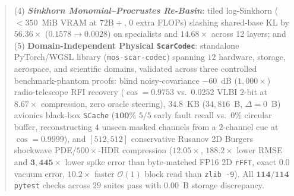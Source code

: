 \documentclass[10pt,twocolumn]{article}
\begin{document}
\begin{abstract}
(4) \textbf{\emph{Sinkhorn Monomial--Procrustes Re-Basin}}: tiled log-Sinkhorn ($<350$~MiB VRAM at $72\text{B}+$, $0$ extra FLOPs) slashing shared-base KL by $56.36\times$ ($0.1578 \to 0.0028$) on specialists and $14.68\times$ across $12$ layers; and
(5) \textbf{Domain-Independent Physical \texttt{ScarCodec}}: standalone PyTorch/WGSL library (\texttt{mos-scar-codec}) spanning $12$ hardware, storage, aerospace, and scientific domains, validated across three controlled benchmark-phantom proofs: blind noisy-covariance $-60$~dB ($1{,}000\times$) radio-telescope RFI recovery ($\cos=\mathbf{0.9753}$ vs.\ $0.0252$ VLBI $2$-bit at $8.67\times$ compression, zero oracle steering), $34.8$~KB ($34{,}816$~B, $\Delta=0$~B) avionics black-box \texttt{SCache} ($\mathbf{100\%}$ $5/5$ early fault recall vs.\ $0\%$ circular buffer, reconstructing $4$ unseen masked channels from a $2$-channel cue at $\cos=\mathbf{0.9999}$), and $[512,512]$ conservative Rusanov 2D Burgers shockwave PDE/$500\times$-HDR compression ($12.05\times$, $\mathbf{188.2\times}$ lower RMSE and $\mathbf{3{,}445\times}$ lower spike error than byte-matched FP16 2D \texttt{rFFT}, exact $0.0$ vacuum error, $10.2\times$ faster $\mathcal{O}(1)$ block read than \texttt{zlib -9}). All $\mathbf{114/114}$ \texttt{pytest} checks across $29$ suites pass with $0.00$~B storage discrepancy.
\end{abstract}
\end{document}
